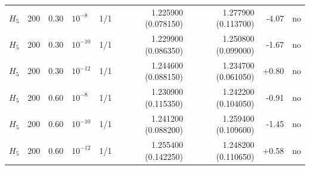 \begin{longtable}{lrrlrrrrc}
$H_5$ & 200 & 0.30 & $10^{-8}$ & 1/1 & 1.225900 (0.078150) & 1.277900 (0.113700) & -4.07 & no\\
$H_5$ & 200 & 0.30 & $10^{-10}$ & 1/1 & 1.229900 (0.086350) & 1.250800 (0.099000) & -1.67 & no\\
$H_5$ & 200 & 0.30 & $10^{-12}$ & 1/1 & 1.244600 (0.088150) & 1.234700 (0.061050) & +0.80 & no\\
$H_5$ & 200 & 0.60 & $10^{-8}$ & 1/1 & 1.230900 (0.115350) & 1.242200 (0.104050) & -0.91 & no\\
$H_5$ & 200 & 0.60 & $10^{-10}$ & 1/1 & 1.241200 (0.088200) & 1.259400 (0.109600) & -1.45 & no\\
$H_5$ & 200 & 0.60 & $10^{-12}$ & 1/1 & 1.255400 (0.142250) & 1.248200 (0.110650) & +0.58 & no\\
\end{longtable}
\endgroup
